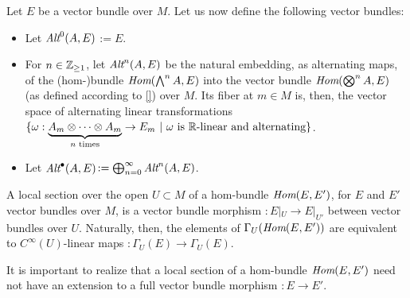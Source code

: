 \begin{definition}
Let $E$ be a vector bundle over $M$. Let us now define the following vector bundles:
    \begin{itemize}
    
    \item Let \emph{$\operatorname{\textit{Alt}}^0(A, E)$}$:= E$. 
    
    \item For $n \in \mathbb{Z}_{\geq 1}$, let \emph{$\operatorname{\textit{Alt}}^n(A, E)$} be the natural embedding, as alternating maps, of the (hom-)bundle $\operatorname{\textit{Hom}}(\bigwedge^n A, E)$ into the vector bundle $\operatorname{\textit{Hom}}(\bigotimes^n A, E)$ (as defined according to \ref{}) over $M$. Its fiber at $m \in M$ is, then, the vector space of alternating linear transformations $\{\omega: \underbrace{A_m \otimes \cdots \otimes A_m}_{\text{$n$ times}} \to E_m \ |\  \text{$\omega$ is $\mathbb{R}$-linear and alternating}\}$.
    
    \item Let \emph{$\operatorname{\textit{Alt}}^\bullet(A, E)$}$:= \bigoplus^\infty_{n = 0} \operatorname{\textit{Alt}}^n(A, E)$.
    
        
    \end{itemize}
    
\end{definition}

\begin{remark}
A local section over the open $U \subset M$ of a hom-bundle $\operatorname{\textit{Hom}}(E, E')$, for $E$ and $E'$ vector bundles over $M$, is a vector bundle morphism $:E|_U \to E|_{U'}$ between vector bundles over $U$. Naturally, then, the elements of $\Gamma_U(\operatorname{\textit{Hom}}(E, E'))$ are equivalent to $C^\infty(U)$-linear maps $: \Gamma_U(E) \to \Gamma_U(E)$. 

It is important to realize that a local section of a hom-bundle $\operatorname{\textit{Hom}}(E, E')$ need not have an extension to a full vector bundle morphism $:E \to E'$.%
\end{remark}

